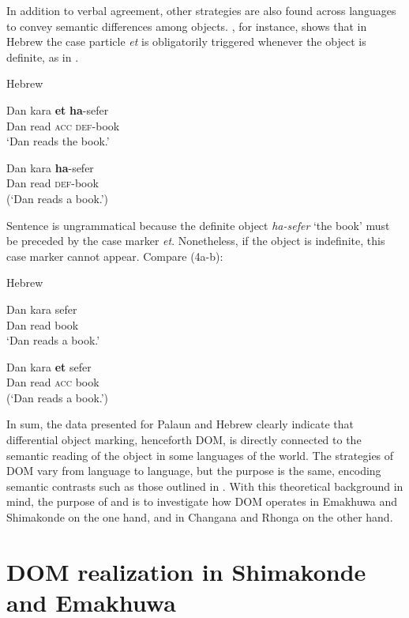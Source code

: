 \documentclass[output=paper]{langsci/langscibook}
\begin{document}
In addition to verbal agreement, other strategies are also found across languages to convey semantic differences among objects. \citet{Danon2002}, for instance, shows that in Hebrew the case particle {\textit{et}} is obligatorily triggered whenever the object is definite, as in .

{Hebrew \citep[1]{Danon2002}}

\ea
\gll Dan       kara       \textbf{et}       \textbf{ha}{}-sefer\\
     Dan       read       {\textsc{acc     def}}{}-book\\
\glt ‘Dan reads the book.’
\z

\ea
\gll *Dan       kara              \textbf{ha}{}-sefer\\
     Dan         read              \textsc{def}{}-book\\
\glt (‘Dan reads a book.’)
\z



Sentence  is ungrammatical because the definite object {\textit{ha-sefer}} ‘the book’ must be preceded by the case marker {\textit{et}}. Nonetheless, if the object is indefinite, this case marker cannot appear. Compare (4a-b):

{Hebrew \citep[1]{Danon2002}}

\ea
\gll Dan         kara                 sefer\\
     Dan         read                  book\\
\glt ‘Dan reads a book.’
\z

\ea
\gll *Dan        kara        \textbf{et}      sefer\\
     Dan          read        {\textsc{acc}}   {}book\\
\glt (‘Dan reads a book.’)
\z

In sum, the data presented for Palaun and Hebrew clearly indicate that differential object marking, henceforth DOM, is directly connected to the semantic reading of the object in some languages of the world. The strategies of DOM vary from language to language, but the purpose is the same, encoding semantic contrasts such as those outlined in . With this theoretical background in mind, the purpose of  and  is to investigate how DOM operates in Emakhuwa and Shimakonde on the one hand, and in Changana and Rhonga on the other hand.

\section{DOM realization in Shimakonde and Emakhuwa}
\end{document}

